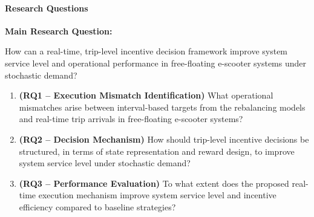 \paragraph{Research Questions}
\textbf{Main Research Question:}


How can a real-time, trip-level incentive decision framework improve system service level and operational performance in free-floating e-scooter systems under stochastic demand?



\begin{enumerate}
    
    
    


\item \textbf{(RQ1 -- Execution Mismatch Identification)}  
What operational mismatches arise between interval-based targets from the rebalancing models and real-time trip arrivals in free-floating e-scooter systems?

\item \textbf{(RQ2 -- Decision Mechanism)}  
How should trip-level incentive decisions be structured, in terms of state representation and reward design, to improve system service level under stochastic demand?

\item \textbf{(RQ3 -- Performance Evaluation)}  
To what extent does the proposed real-time execution mechanism improve system service level and incentive efficiency compared to baseline strategies?

\end{enumerate}

